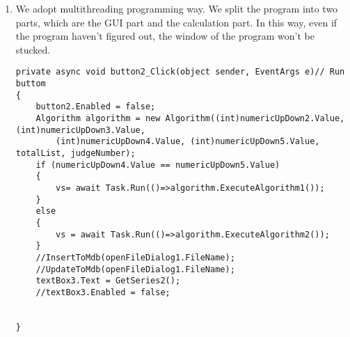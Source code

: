 \begin{enumerate}
    \item We adopt multithreading programming way. We split the program into two parts, which are the GUI part and the 
    calculation part. In this way, even if the program haven't figured out, the window of the program won't be stucked.
    \begin{lstlisting}
private async void button2_Click(object sender, EventArgs e)// Run buttom
{
    button2.Enabled = false;
    Algorithm algorithm = new Algorithm((int)numericUpDown2.Value, (int)numericUpDown3.Value,
        (int)numericUpDown4.Value, (int)numericUpDown5.Value, totalList, judgeNumber);
    if (numericUpDown4.Value == numericUpDown5.Value)
    {
        vs= await Task.Run(()=>algorithm.ExecuteAlgorithm1());
    }
    else
    {
        vs = await Task.Run(()=>algorithm.ExecuteAlgorithm2());
    }
    //InsertToMdb(openFileDialog1.FileName);
    //UpdateToMdb(openFileDialog1.FileName);
    textBox3.Text = GetSeries2();
    //textBox3.Enabled = false;
    

}
    \end{lstlisting}
\end{enumerate}